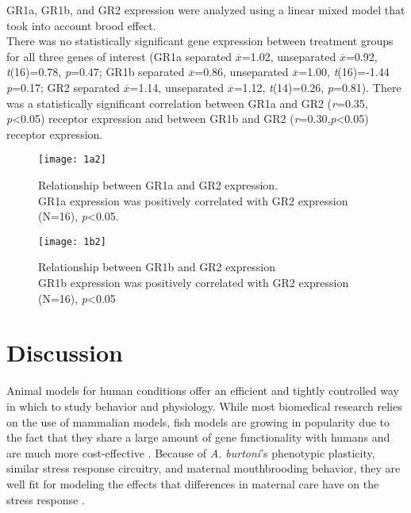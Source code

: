 \documentclass[12pt,twoside]{reedthesis}
\begin{document}
GR1a, GR1b, and GR2 expression were analyzed using a linear mixed model that
took into account brood effect. \\
There was no statistically significant gene expression between treatment groups
for all three genes of interest (GR1a separated $\overline{x}$=1.02, unseparated
$\overline{x}$=0.92, \textit{t}(16)=0.78, \textit{p}=0.47; GR1b separated
$\overline{x}$=0.86, unseparated $\overline{x}$=1.00, \textit{t}(16)=-1.44 \textit{p}=0.17; GR2 separated $\overline{x}$=1.14,
unseparated $\overline{x}$=1.12, \textit{t}(14)=0.26, \textit{p}=0.81). There was a statistically significant
correlation between GR1a and GR2 (\textit{r}=0.35, \textit{p}<0.05) receptor
expression and between GR1b and GR2
(\textit{r}=0.30,\textit{p}<0.05) receptor expression.

\begin{figure}[htbp] 
\begin{center} 
\texttt{[image: 1a2]}
\caption[Relationship between GR1a and GR2
expression]{\footnotesize{Relationship between GR1a and GR2 expression.\\ GR1a
    expression was positively correlated with GR2 expression (N=16), \textit{p}<0.05.}}
\label{subd}
\end{center} 
\end{figure}

\begin{figure}[htbp] 
\begin{center} 
\texttt{[image: 1b2]}
\caption[Relationship between GR1b and GR2
expression]{\footnotesize{Relationship between GR1b and GR2 expression\\ GR1b
    expression was positively correlated with GR2 expression (N=16), \textit{p}<0.05}}
\label{subd}
\end{center} 
\end{figure}


\chapter{Discussion}

Animal models for human conditions offer an efficient and tightly controlled way
in which to study behavior and physiology. While most biomedical research
relies on the use of mammalian models, fish models are growing in popularity due to
the fact that they share a large amount of gene
functionality with humans and are much more cost-effective
\citep{cech_cellular_2011}. 
Because of \textit{A. burtoni}'s phenotypic plasticity, similar stress
response circuitry, and maternal
mouthbrooding behavior, they are well fit for modeling the effects that
differences in maternal care have on the stress response
\citep{greenwood_multiple_2003, pijanowski_activity_2015, renn_fish_2008}.
\end{document}
